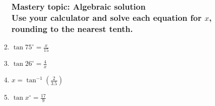 \documentclass[12pt, twoside]{article}
\begin{document}
\begin{enumerate}
\subsubsection*{Mastery topic: Algebraic solution\\[0.5cm]
Use your calculator and solve each equation for $x$, rounding to the nearest tenth.}
\item $\displaystyle \tan 75^\circ = \frac{x}{15}$ \vspace{3cm}
\item $\displaystyle \tan 26^\circ = \frac{4}{x}$ \vspace{4cm}
\item $\displaystyle x = \tan^{-1} (\frac{2}{3.5})$ \vspace{3cm}
\item $\displaystyle \tan x^\circ = \frac{17}{9}$ \vspace{3cm}

\end{enumerate}
\end{document}
